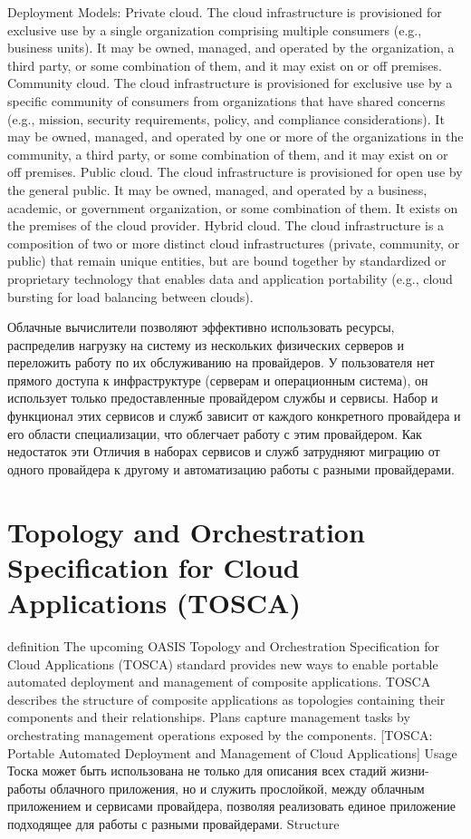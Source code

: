 \fi 
Deployment Models:
Private cloud. The cloud infrastructure is provisioned for exclusive use by a single organization
comprising multiple consumers (e.g., business units). It may be owned, managed, and
operated by the organization, a third party, or some combination of them, and it may exist
on or off premises.
Community cloud. The cloud infrastructure is provisioned for exclusive use by a specific
community of consumers from organizations that have shared concerns (e.g., mission,
security requirements, policy, and compliance considerations). It may be owned,
managed, and operated by one or more of the organizations in the community, a third
party, or some combination of them, and it may exist on or off premises.
Public cloud. The cloud infrastructure is provisioned for open use by the general public. It may be
owned, managed, and operated by a business, academic, or government organization, or
some combination of them. It exists on the premises of the cloud provider.
Hybrid cloud. The cloud infrastructure is a composition of two or more distinct cloud
infrastructures (private, community, or public) that remain unique entities, but are bound
together by standardized or proprietary technology that enables data and application
portability (e.g., cloud bursting for load balancing between clouds). 



Облачные вычислители позволяют эффективно использовать ресурсы, распределив нагрузку на систему  из нескольких физических серверов и переложить работу по их обслуживанию на провайдеров.
У пользователя нет прямого доступа к инфраструктуре (серверам и операционным система), он использует только предоставленные провайдером службы и сервисы. 
Набор и функционал этих сервисов и служб зависит от каждого конкретного провайдера и его области специализации, что облегчает работу с этим провайдером. Как недостаток эти Отличия в наборах сервисов и служб затрудняют миграцию от одного провайдера к другому и автоматизацию работы с разными провайдерами.
\fi 

\section{Topology and Orchestration Specification for Cloud	Applications (TOSCA)}
definition
The upcoming OASIS Topology and Orchestration Specification for
Cloud Applications (TOSCA) standard provides new ways to enable portable automated
deployment and management of composite applications. TOSCA describes the
structure of composite applications as topologies containing their components and
their relationships. Plans capture management tasks by orchestrating management
operations exposed by the components.
[TOSCA: Portable Automated Deployment and Management of Cloud Applications]
Usage
Тоска может быть использована не только для описания всех стадий жизни- работы облачного приложения, но и служить прослойкой, между облачным приложением и сервисами провайдера, позволяя реализовать единое приложение подходящее для работы с разными провайдерами. 
\fi 
Structure

